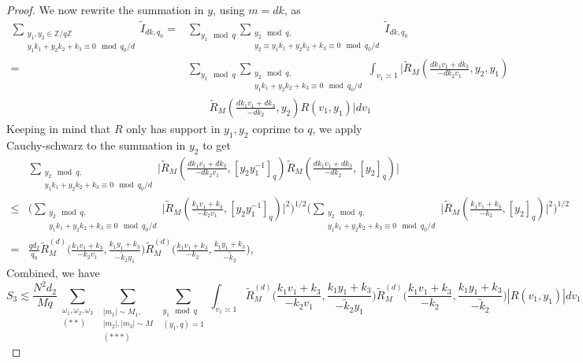 \begin{proof}
    We now rewrite the summation in $y$, using $m=dk$, as \begin{align*}
        \sum_{\substack{y_1,y_2 \in\mathbb{Z}/q\mathbb{Z} \\ y_1k_1+y_2k_2+k_3\equiv 0 \mod q_0/d}}\tilde{I}_{d k ,q_0} =& \sum_{y_1\mod q} \sum_{\substack{y_2 \mod q,\\y_2\equiv y_1k_1+y_2k_2+k_3\equiv 0 \mod q_0/d}
        } \tilde{I}_{dk ,q_0}\\
        =&\sum_{y_1\mod q} \sum_{\substack{y_2 \mod q,\\ y_1k_1+y_2k_2+k_3\equiv 0 \mod q_0/d} }\int_{v_1\asymp 1} \Bigg| \tilde{R}_M\left(\frac{dk_1v_1+dk_3}{-dk_2v_1},y_2,y_1\right)\\
        & \quad \quad
        \tilde{R}_M\left(\frac{dk_1v_1+dk_3}{-dk_2},y_2\right)R\left(v_1,y_1\right)\Bigg| dv_1
    \end{align*}
    Keeping in mind that $R$ only has support in $y_1,y_2$ coprime to $q$, we apply Cauchy-schwarz to the summation in $y_2$ to get \begin{align*}
        &\sum_{\substack{y_2 \mod q,\\ y_1k_1+y_2k_2+k_3\equiv 0 \mod q_0/d} } \Bigg|\tilde{R}_M\left(\frac{dk_1v_1+dk_3}{-dk_2v_1},[y_2y_1^{-1}]_{q}\right)\tilde{R}_M\left(\frac{dk_1v_1+dk_3}{-dk_2},[y_2]_q\right)\Bigg|\\
        \leq &\Bigg(\sum_{\substack{y_2 \mod q,\\ y_1k_1+y_2k_2+k_3\equiv 0 \mod q_0/d} }\Big|\tilde{R}_M\left(\frac{k_1v_1+k_3}{-k_2v_1},[y_2y_1^{-1}]_{q}\right)\Big|^2\Bigg)^{1/2}
       \Bigg( \sum_{\substack{y_2 \mod q,\\ y_1k_1+y_2k_2+k_3\equiv 0 \mod q_0/d}  }
        \Big|\tilde{R}_M\left(\frac{k_1v_1+k_3}{-k_2},[y_2]_q\right)\Big|^2 \Bigg)^{1/2}\\
        =&\frac{qd_2}{q_0}\tilde{R}_M^{(d)}\Big(\frac{k_1v_1+k_3}{-k_2v_1},\frac{k_1y_1+k_3}{-\tilde{k}_2y_1}\Big)\tilde{R}_M^{(d)}\Big(\frac{k_1v_1+k_3}{-k_2},\frac{k_1y_1+k_3}{-\tilde{k}_2}\Big),
    \end{align*} 
    Combined, we have \[
        S_3\lesssim \frac{N^2d_2}{Mq} \sum_{\substack{\omega_1,\omega_2,\omega_3\\ (**)}} \sum_{\substack{|m_1|\sim M_1,\\|m_2|,|m_3|\sim M\\
        (***)}}\sum_{\substack{y_1\mod q\\ (y_1,q)=1} }\int_{v_1\asymp 1}
        \tilde{R}_M^{(d)}\Big(\frac{k_1v_1+k_3}{-k_2v_1},\frac{k_1y_1+k_3}{-\tilde{k}_2y_1}\Big)\tilde{R}_M^{(d)}\Big(\frac{k_1v_1+k_3}{-k_2},\frac{k_1y_1+k_3}{-\tilde{k}_2}\Big)|R\left(v_1,y_1\right)| dv_1
    \]
\end{proof}
